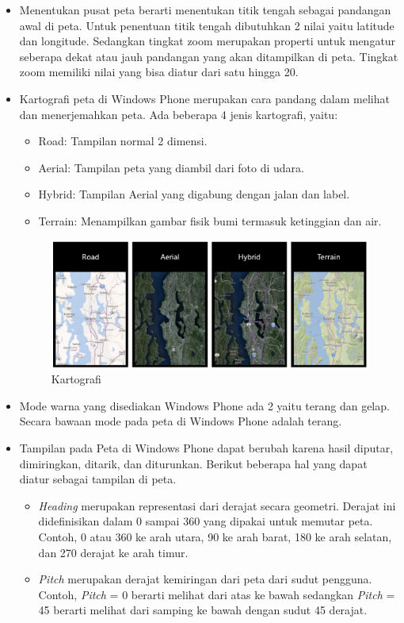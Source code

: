 \begin{itemize}
	\item Menentukan pusat peta berarti menentukan titik tengah sebagai pandangan awal di peta. Untuk penentuan titik tengah dibutuhkan 2 nilai yaitu latitude dan longitude. Sedangkan tingkat zoom merupakan properti untuk mengatur seberapa dekat atau jauh pandangan yang akan ditampilkan di peta. Tingkat zoom memiliki nilai yang bisa diatur dari satu hingga 20. 
	\item Kartografi peta di Windows Phone merupakan cara pandang dalam melihat dan menerjemahkan peta. Ada beberapa 4 jenis kartografi, yaitu:
		
		\begin{itemize}
			\item Road: Tampilan normal 2 dimensi.
			\item Aerial: Tampilan peta yang diambil dari foto di udara.
			\item Hybrid: Tampilan Aerial yang digabung dengan jalan dan label.
			\item Terrain: Menampilkan gambar fisik bumi termasuk ketinggian dan air.
		\end{itemize}
		
		\begin{figure}[h]
			\centering
				\includegraphics[scale=0.4]{Gambar/kartografi}
			\caption{Kartografi}
			\label{fig:Kartografi}
		\end{figure}
		
	\item	Mode warna yang disediakan Windows Phone ada 2 yaitu terang dan gelap. Secara bawaan mode pada peta di Windows Phone adalah terang.
	
	\item Tampilan pada Peta di Windows Phone dapat berubah karena hasil diputar, dimiringkan, ditarik, dan diturunkan. Berikut beberapa hal yang dapat diatur sebagai tampilan di peta.
	
		\begin{itemize}
			\item \textit{Heading} merupakan representasi dari derajat secara geometri. Derajat ini didefinisikan dalam 0 sampai 360 yang dipakai untuk memutar peta. Contoh, 0 atau 360 ke arah utara, 90 ke arah barat, 180 ke arah selatan, dan 270 derajat ke arah timur.
			\item \textit{Pitch} merupakan derajat kemiringan dari peta dari sudut pengguna. Contoh, \textit{Pitch} = 0 berarti melihat dari atas ke bawah sedangkan \textit{Pitch} = 45 berarti melihat dari samping ke bawah dengan sudut 45 derajat.
		\end{itemize} 
\end{itemize}

